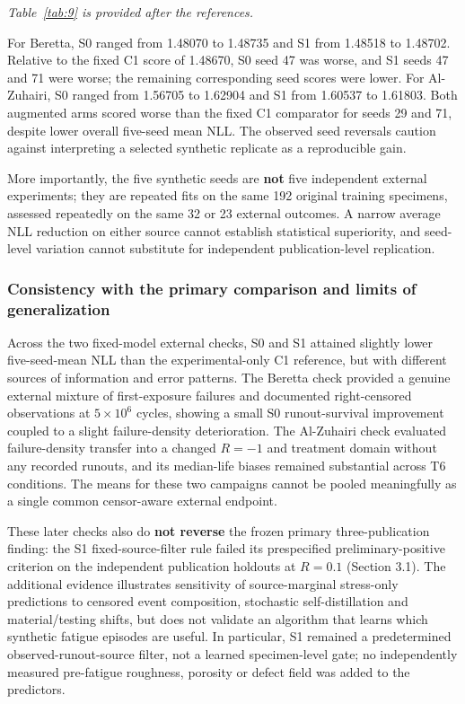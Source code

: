 \documentclass[12pt,a4paper]{article}
\begin{document}
\noindent\textit{Table~\ref{tab:9} is provided after the references.}\par

For Beretta, S0 ranged from 1.48070 to 1.48735 and S1 from 1.48518 to 1.48702. Relative to the fixed C1 score of 1.48670, S0 seed 47 was worse, and S1 seeds 47 and 71 were worse; the remaining corresponding seed scores were lower. For Al-Zuhairi, S0 ranged from 1.56705 to 1.62904 and S1 from 1.60537 to 1.61803. Both augmented arms scored worse than the fixed C1 comparator for seeds 29 and 71, despite lower overall five-seed mean NLL. The observed seed reversals caution against interpreting a selected synthetic replicate as a reproducible gain.

More importantly, the five synthetic seeds are \textbf{not} five independent external experiments; they are repeated fits on the same 192 original training specimens, assessed repeatedly on the same 32 or 23 external outcomes. A narrow average NLL reduction on either source cannot establish statistical superiority, and seed-level variation cannot substitute for independent publication-level replication.

\subsubsection{Consistency with the primary comparison and limits of generalization}

Across the two fixed-model external checks, S0 and S1 attained slightly lower five-seed-mean NLL than the experimental-only C1 reference, but with different sources of information and error patterns. The Beretta check provided a genuine external mixture of first-exposure failures and documented right-censored observations at \(5\times10^6\) cycles, showing a small S0 runout-survival improvement coupled to a slight failure-density deterioration. The Al-Zuhairi check evaluated failure-density transfer into a changed \(R=-1\) and treatment domain without any recorded runouts, and its median-life biases remained substantial across T6 conditions. The means for these two campaigns cannot be pooled meaningfully as a single common censor-aware external endpoint.

These later checks also do \textbf{not reverse} the frozen primary three-publication finding: the S1 fixed-source-filter rule failed its prespecified preliminary-positive criterion on the independent publication holdouts at \(R=0.1\) (Section 3.1). The additional evidence illustrates sensitivity of source-marginal stress-only predictions to censored event composition, stochastic self-distillation and material/testing shifts, but does not validate an algorithm that learns which synthetic fatigue episodes are useful. In particular, S1 remained a predetermined observed-runout-source filter, not a learned specimen-level gate; no independently measured pre-fatigue roughness, porosity or defect field was added to the predictors.
\end{document}
